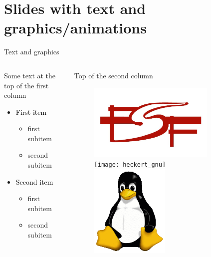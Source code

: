 \documentclass[11pt,t]{beamer}
\begin{document}
\section{Slides with text and graphics/animations}
\begin{frame}[t]{Text and graphics}
	\begin{columns}
		\begin{column}{0.8\textwidth}
			Some text at the top of the first column
			\vspace{5mm}
			\begin{itemize}
				\item \textcolor{black}{First item}
					\begin{itemize}
						\item first subitem
						\item second subitem
					\end{itemize}
				\item \textcolor{black}{Second item}
					\begin{itemize}
						\item first subitem
						\item second subitem
					\end{itemize}
			\end{itemize}
		\end{column}
		\begin{column}{.2\textwidth}
			Top of the second column
			\begin{figure}
				\includegraphics[width=0.8\textwidth]{FSF_Logo_menor}\\
				\vspace{4mm}
				\texttt{[image: heckert\_gnu]}\\
				\vspace{4mm}
				\includegraphics[width=0.5\textwidth]{Tux}\\				

\end{figure}
\end{column}
\end{columns}
\end{frame}
\end{document}
